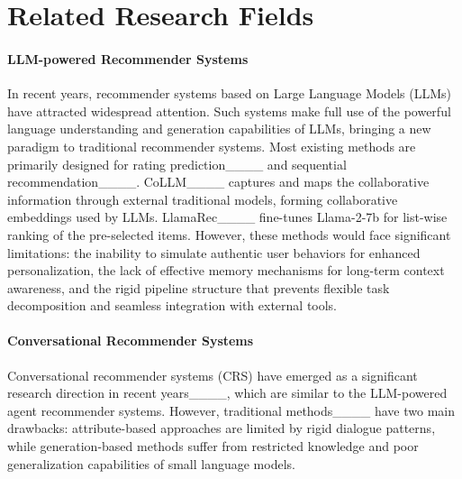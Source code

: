 \section{Related Research Fields}
\paragraph{LLM-powered Recommender Systems} In recent years, recommender systems based on Large Language Models (LLMs) have attracted widespread attention. 
Such systems make full use of the powerful language understanding and generation capabilities of LLMs, bringing a new paradigm to traditional recommender systems.
Most existing methods are primarily designed for rating prediction____ and sequential recommendation____.
CoLLM____ captures and maps the collaborative information through external traditional models, forming collaborative embeddings used by LLMs. 
LlamaRec____ fine-tunes Llama-2-7b for list-wise ranking of the pre-selected items.
However, these methods would face significant limitations: the inability to simulate authentic user behaviors for enhanced personalization, the lack of effective memory mechanisms for long-term context awareness, and the rigid pipeline structure that prevents flexible task decomposition and seamless integration with external tools.

\paragraph{Conversational Recommender Systems}

Conversational recommender systems (CRS) have emerged as a significant research direction in recent years____, which are similar to the LLM-powered agent recommender systems. 
However, traditional methods____ have two main drawbacks: attribute-based approaches are limited by rigid dialogue patterns, while generation-based methods suffer from restricted knowledge and poor generalization capabilities of small language models.